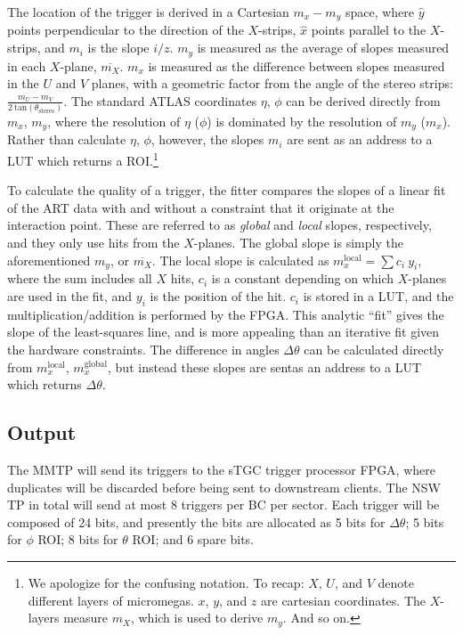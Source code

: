 The location of the trigger is derived in a Cartesian $m_x-m_y$ space, where $\hat{y}$ points perpendicular to the direction of the $X$-strips, $\hat{x}$ points parallel to the $X$-strips, and $m_i$ is the slope $i/z$. $m_y$ is measured as the average of slopes measured in each $X$-plane, $\overline{m_X}$. $m_x$ is measured as the difference between slopes measured in the $U$ and $V$ planes, with a geometric factor from the angle of the stereo strips: $\frac{m_U - m_V}{2\ \text{tan}(\theta_\text{stereo})}$. The standard ATLAS coordinates $\eta$, $\phi$ can be derived directly from $m_x$, $m_y$, where the resolution of $\eta$ ($\phi$) is dominated by the resolution of $m_y$ ($m_x$). Rather than calculate $\eta$, $\phi$, however, the slopes $m_i$ are sent as an address to a LUT which returns a ROI.\footnote{We apologize for the confusing notation. To recap: $X$, $U$, and $V$ denote different layers of micromegas. $x$, $y$, and $z$ are cartesian coordinates. The $X$-layers measure $m_X$, which is used to derive $m_y$. And so on.}

To calculate the quality of a trigger, the fitter compares the slopes of a linear fit of the ART data with and without a constraint that it originate at the interaction point. These are referred to as \textit{global} and \textit{local} slopes, respectively, and they only use hits from the $X$-planes. The global slope is simply the aforementioned $m_y$, or $\overline{m_X}$. The local slope is calculated as $m_x^\text{local} = \sum c_i \ y_i$, where the sum includes all $X$ hits, $c_i$ is a constant depending on which $X$-planes are used in the fit, and $y_i$ is the position of the hit. $c_i$ is stored in a LUT, and the multiplication/addition is performed by the FPGA. This analytic ``fit'' gives the slope of the least-squares line, and is more appealing than an iterative fit given the hardware constraints. The difference in angles $\Delta\theta$ can be calculated directly from $m_x^\text{local}$, $m_x^\text{global}$, but instead these slopes are sentas an address to a LUT which returns $\Delta\theta$.

\subsection{Output}
\label{sec:alg-output}

The MMTP will send its triggers to the sTGC trigger processor FPGA, where duplicates will be discarded before being sent to downstream clients. The NSW TP in total will send at most 8 triggers per BC per sector. Each trigger will be composed of 24 bits, and presently the bits are allocated as 5 bits for $\Delta\theta$; 5 bits for $\phi$ ROI; 8 bits for $\theta$ ROI; and 6 spare bits.


